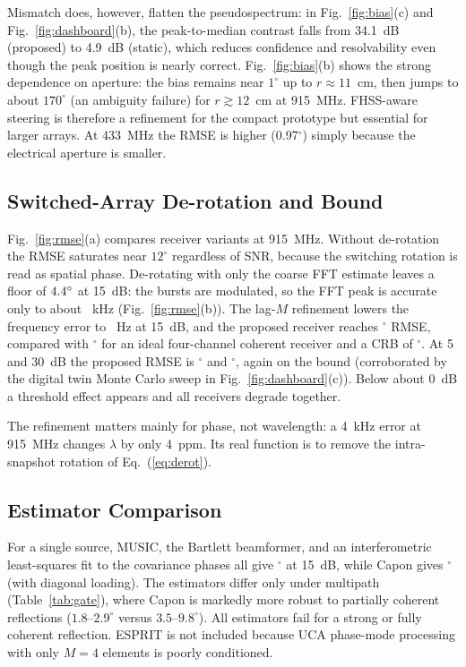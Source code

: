 \documentclass[conference]{IEEEtran}
\begin{document}
Mismatch does, however, flatten the pseudospectrum: in Fig.~\ref{fig:bias}(c) and Fig.~\ref{fig:dashboard}(b), the peak-to-median contrast falls from 34.1~dB (proposed) to 4.9~dB (static), which reduces confidence and resolvability even though the peak position is nearly correct. Fig.~\ref{fig:bias}(b) shows the strong dependence on aperture: the bias remains near $1^\circ$ up to $r\approx 11$~cm, then jumps to about $170^\circ$ (an ambiguity failure) for $r\gtrsim12$~cm at 915~MHz. FHSS-aware steering is therefore a refinement for the compact prototype but essential for larger arrays. At 433~MHz the RMSE is higher (0.97$^\circ$) simply because the electrical aperture is smaller.

\subsection{Switched-Array De-rotation and Bound}
Fig.~\ref{fig:rmse}(a) compares receiver variants at 915~MHz. Without de-rotation the RMSE saturates near $12^\circ$ regardless of SNR, because the switching rotation is read as spatial phase. De-rotating with only the coarse FFT estimate leaves a floor of $4.4^\circ$ at 15~dB: the bursts are modulated, so the FFT peak is accurate only to about \feCoarseFifteen~kHz (Fig.~\ref{fig:rmse}(b)). The lag-$M$ refinement lowers the frequency error to \feFineFifteen~Hz at 15~dB, and the proposed receiver reaches \rmseFifteen$^\circ$ RMSE, compared with \rmseIdealFifteen$^\circ$ for an ideal four-channel coherent receiver and a CRB of \crbFifteen$^\circ$. At 5 and 30~dB the proposed RMSE is \rmseFive$^\circ$ and \rmseThirty$^\circ$, again on the bound (corroborated by the digital twin Monte Carlo sweep in Fig.~\ref{fig:dashboard}(c)). Below about 0~dB a threshold effect appears and all receivers degrade together.

The refinement matters mainly for phase, not wavelength: a 4~kHz error at 915~MHz changes $\lambda$ by only 4~ppm. Its real function is to remove the intra-snapshot rotation of Eq.~(\ref{eq:derot}).


\subsection{Estimator Comparison}
For a single source, MUSIC, the Bartlett beamformer, and an interferometric least-squares fit to the covariance phases all give \rmseFifteen$^\circ$ at 15~dB, while Capon gives \capFifteen$^\circ$ (with diagonal loading). The estimators differ only under multipath (Table~\ref{tab:gate}), where Capon is markedly more robust to partially coherent reflections ($1.8$--$2.9^\circ$ versus $3.5$--$9.8^\circ$). All estimators fail for a strong or fully coherent reflection. ESPRIT is not included because UCA phase-mode processing with only $M=4$ elements is poorly conditioned.
\end{document}

